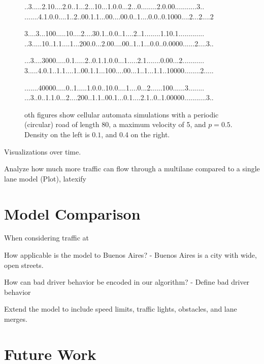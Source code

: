 \documentclass{article}
\begin{document}
\begin{figure}[h]
\begin{minipage}[t]{.5\textwidth}
..3.....2.10....2.0..1...2...10...1.0.0...2...0........2.0.00...........3..
.......4.1.0.0....1..2..00.1.1...00....00.0..1....0.0..0.1000....2...2....2

3....3...100.....10....2....30.1..0.0..1....2..1........1.10.1.............
..3.....10..1.1....1...200.0...2.00....00..1..1...0.0..0.0000......2....3..

...3....3000.....0.1.....2..0.1.1.0.0...1.....2.1.......0.00...2...........
3.....4.0.1..1.1....1..00.1.1...100....00...1..1...1.1..10000........2.....

.......40000.....0..1.....1.0.0..10.0....1....0...2......100......3........
...3..0..1.1.0...2....200..1.1..00.1...0.1....2.1..0..1.00000...........3..
\end{minipage}

\caption{oth figures show cellular automata simulations with a periodic (circular) road of length 80, a maximum velocity of 5, and $p = 0.5$. Density on the left is $0.1$, and 0.4 on the right.}
\end{figure}










Visualizations over time. 

Analyze how much more traffic can flow through a multilane compared to a single lane model (Plot), latexify
\section*{Model Comparison}
When considering traffic at 


How applicable is the model to Buenos Aires?
- Buenos Aires is a city with wide, open streets. 

How can bad driver behavior be encoded in our algorithm?
- Define bad driver behavior

Extend the model to include speed limits, traffic lights, obstacles, and lane merges. 

\section*{Future Work}













\end{document}
